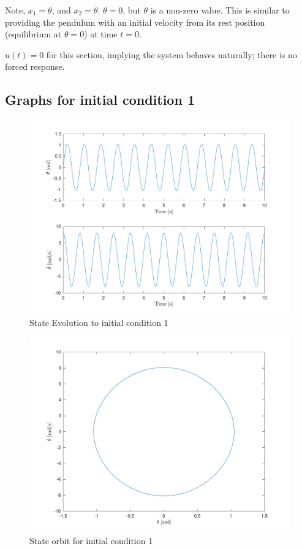 \documentclass[10pt]{article}
\begin{document}
Note, $x_1 = \theta$, and $x_2 = \dot{\theta}$. 
$\theta = 0$, but $\dot{\theta}$ is a non-zero value. This is similar to providing the pendulum with an initial velocity from its rest position (equilibrium at $\theta = 0$) at time $t = 0$.

$u(t) = 0$ for this section, implying the system behaves naturally; there is no forced response.

\subsection{Graphs for initial condition 1}
    
    \begin{figure}[h]
     \includegraphics[scale=0.7]{lab1/figs/section3_x0_1_state_evolution.pdf}
     \caption{State Evolution to initial condition 1}
     \label{figure:x_0_1_state_evolution}
    \end{figure}
    
    \begin{figure}[ht]
     \includegraphics[scale=0.7]{lab1/figs/section3_x0_1_state_orbit.pdf}
     \caption{State orbit for initial condition 1}
     \label{figure:x_0_1_state_evolution}
    \end{figure}
\end{document}
